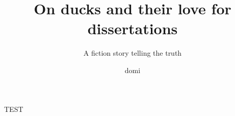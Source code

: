 \documentclass[12pt,a4paper]{scrreprt}
\title{On ducks and their love for dissertations}
\subtitle{A fiction story telling the truth}
\author{domi}
\begin{document}
\maketitle
\newpage
TEST
\end{document}
